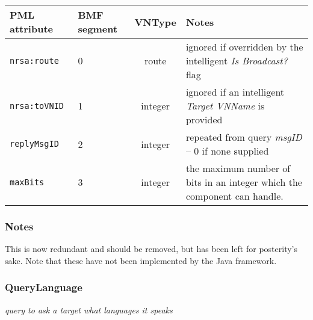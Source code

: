 \documentclass[pdftex,a4paper]{article}
\newcommand{\XMLfont}[1]{{\tt \small #1}}
\begin{document}
\begin{table}[!h]
  \begin{center}
    \label{tab:ReplyNumberType}
    \begin{tabular}{|l|p{13mm}|c|p{60mm}|}
      \hline

      \textbf{PML attribute} & \textbf{BMF segment} & \textbf{VNType}
      & \textbf{Notes} \\\hline

      \XMLfont{nrsa:route} & 0 & route & ignored if overridden by the
      intelligent {\em Is Broadcast?} flag \\ \hline

      \XMLfont{nrsa:toVNID} & 1 & integer & ignored if an intelligent {\em
      Target VNName} is provided \\\hline

      \XMLfont{replyMsgID} & 2 & integer & repeated from query {\em
      msgID} -- 0 if none supplied \\\hline

      \XMLfont{maxBits} & 3 & integer & the maximum number of bits in
      an integer which the component can handle. \\\hline

    \end{tabular}
  \end{center}
\end{table}

\subsubsection*{Notes}
This is now redundant and should be removed, but has been left for posterity's
sake. Note that these have not been implemented by the Java framework.


\clearpage

\subsubsection{QueryLanguage}
{\em query to ask a target what languages it speaks}
\end{document}
